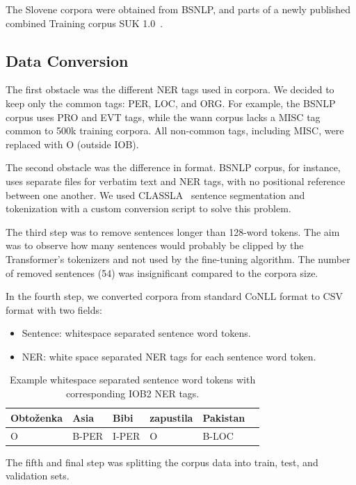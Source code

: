 \documentclass[sigconf]{acmart}
\begin{document}
The Slovene corpora were obtained from BSNLP, and parts of a newly published combined Training corpus {SUK} 1.0~\cite{SUK-1.0}.

\subsection{Data Conversion}
\label{subsec:data-conversion}
The first obstacle was the different NER tags used in corpora.
We decided to keep only the common tags: PER, LOC, and ORG\@.
For example, the BSNLP corpus uses PRO and EVT tags, while the wann corpus lacks a MISC tag common to 500k training corpora.
All non-common tags, including MISC, were replaced with O (outside IOB).

The second obstacle was the difference in format.
BSNLP corpus, for instance, uses separate files for verbatim text and NER tags, with no positional reference between one another.
We used CLASSLA~\cite{ljubesic-dobrovoljc-2019-neural} sentence segmentation and tokenization with a custom conversion script to solve this problem.

The third step was to remove sentences longer than 128-word tokens. 
The aim was to observe how many sentences would probably be clipped by the Transformer's tokenizers and not used by the fine-tuning algorithm.
The number of removed sentences (54) was insignificant compared to the corpora size.

In the fourth step, we converted corpora from standard CoNLL format to CSV format with two fields:
\begin{itemize}
  \item Sentence: whitespace separated sentence word tokens.
  \item NER: white space separated NER tags for each sentence word token.
\end{itemize}

\begin{table}[H]
  \caption{Example whitespace separated sentence word tokens with corresponding IOB2 NER tags.}
  \label{tab:ner_example}
  \begin{tabular}{llllll}
    \toprule
    Obtoženka&Asia&Bibi&zapustila&Pakistan\\
    \midrule
    O&B-PER&I-PER&O&B-LOC\\
    \bottomrule
  \end{tabular}
\end{table}
The fifth and final step was splitting the corpus data into train, test, and validation sets.
\end{document}
